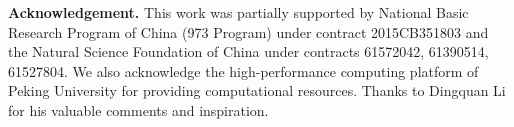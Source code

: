 \documentclass{llncs}
\begin{document}
\textbf{Acknowledgement.} This work was partially supported by National Basic Research Program of China (973 Program) under contract 2015CB351803 and the Natural Science Foundation of China under contracts 61572042, 61390514, 61527804. We also acknowledge the high-performance computing platform of Peking University for providing computational resources. Thanks to Dingquan Li for his valuable comments and inspiration.


\end{document}
